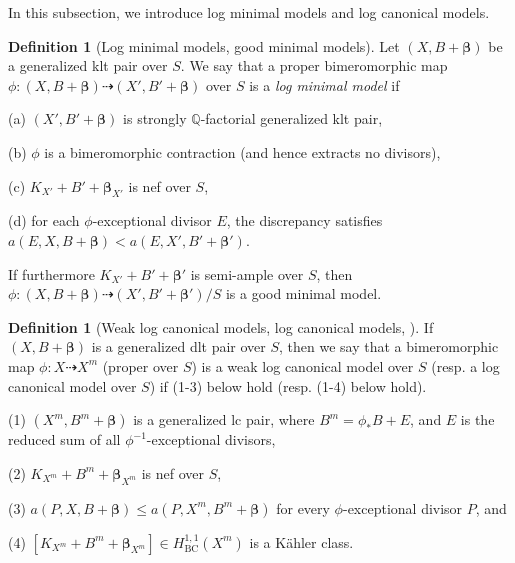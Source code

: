 \documentclass[11pt]{amsart}
\numberwithin{equation}{section}
\def\bbeta{\boldsymbol{\beta}}
\newcommand\Q{{\mathbb{Q}}}
\theoremstyle{definition}
\theoremstyle{definition}
\theoremstyle{definition}
\newtheorem{definition}[theorem]{Definition}
\begin{document}
In this subsection, we introduce log minimal models and log canonical models.
\begin{definition}[Log minimal models, good minimal models]
Let $(X,B+\bbeta)$ be a generalized klt pair over $S$. We say that a proper bimeromorphic map $\phi: (X,B+ \bbeta)\dasharrow (X',B'+ \bbeta)$ over $S$ is a \textit{log minimal model} if 

(a) $(X',B'+ \bbeta)$ is strongly $\Q$-factorial generalized klt pair,

(b) $\phi$ is a bimeromorphic contraction (and hence extracts no divisors),

(c) $K_{X'}+B'+ \bbeta_{X'}$ is nef over $S$,

(d) for each $\phi$-exceptional divisor $E$, the discrepancy satisfies $a(E,X,B+\bbeta)< a(E,X',B'+ \bbeta')$.

If furthermore $K_{X'}+B'+\bbeta'$ is semi-ample over $S$, then $\phi:  (X,B+ \bbeta)\dasharrow (X',B'+ \bbeta')/S$ is a good minimal model. 
\end{definition}

\begin{definition}[{Weak log canonical models, log canonical models, \cite[Definition 2.11]{DHY23}}]\label{def-lcm}
If $(X , B+\boldsymbol{\beta})$ is a generalized dlt pair over $S$, then we say that a bimeromorphic map $\phi: X \dasharrow X^m$ (proper over $S$) is a weak log canonical model over $S$ (resp. a log canonical model over $S$) if (1-3) below hold (resp. (1-4) below hold).

(1) $(X^m, B^m+\boldsymbol{\beta})$ is a generalized lc pair, where $B^m=\phi_* B+E$, and $E$ is the reduced sum of all $\phi^{-1}$-exceptional divisors,

(2) $K_{X^m}+B^m+\boldsymbol{\beta}_{X^m}$ is nef over $S$,

(3) $a(P, X, B+ \boldsymbol{\beta}) \leq a\left(P, X^m, B^m+ \boldsymbol{\beta}\right)$ for every $\phi$-exceptional divisor $P$, and

(4) $\left[K_{X^{ m}}+B^m+\boldsymbol{\beta}_{X^m}\right] \in H_{\mathrm{BC}}^{1,1}\left(X^m\right)$ is a K\"ahler class.
\end{definition}
\end{document}
